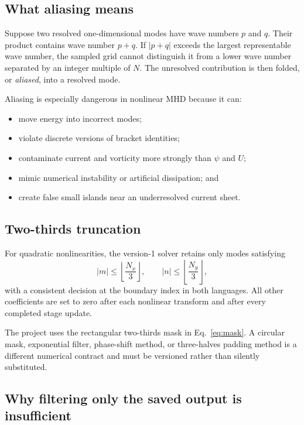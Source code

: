 \documentclass[11pt]{article}
\begin{document}
\subsection{What aliasing means}

Suppose two resolved one-dimensional modes have wave numbers $p$ and $q$. Their product contains wave number $p+q$. If $|p+q|$ exceeds the largest representable wave number, the sampled grid cannot distinguish it from a lower wave number separated by an integer multiple of $N$. The unresolved contribution is then folded, or \emph{aliased}, into a resolved mode.

Aliasing is especially dangerous in nonlinear MHD because it can:
\begin{itemize}
  \item move energy into incorrect modes;
  \item violate discrete versions of bracket identities;
  \item contaminate current and vorticity more strongly than $\psi$ and $U$;
  \item mimic numerical instability or artificial dissipation; and
  \item create false small islands near an underresolved current sheet.
\end{itemize}

\subsection{Two-thirds truncation}

For quadratic nonlinearities, the version-1 solver retains only modes satisfying
\begin{equation}
|m|\le \left\lfloor\frac{N_x}{3}\right\rfloor,
\qquad
|n|\le \left\lfloor\frac{N_y}{3}\right\rfloor,
\label{eq:mask}
\end{equation}
with a consistent decision at the boundary index in both languages. All other coefficients are set to zero after each nonlinear transform and after every completed stage update.

\begin{conventionbox}
The project uses the rectangular two-thirds mask in Eq.~\eqref{eq:mask}. A circular mask, exponential filter, phase-shift method, or three-halves padding method is a different numerical contract and must be versioned rather than silently substituted.
\end{conventionbox}

\subsection{Why filtering only the saved output is insufficient}
\end{document}

